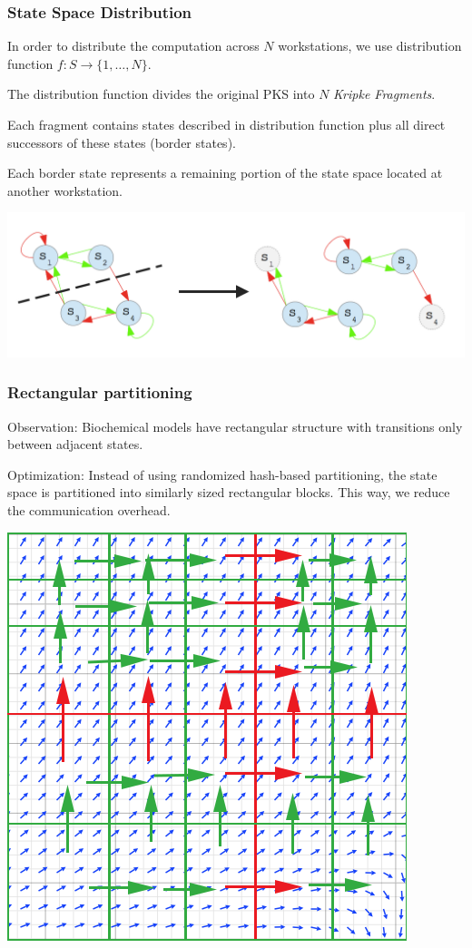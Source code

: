 \documentclass{beamer}
\begin{document}
  \begin{frame}
  	\frametitle{State Space Distribution}
  	In order to distribute the computation across $N$ workstations, we use distribution function $f: S \rightarrow \{1, \dots, N\}$.
  	
  	The distribution function divides the original PKS into $N$ \emph{Kripke Fragments}. 
  	
  	Each fragment contains states described in distribution function plus all direct successors of these states (border states).
  	
  	Each border state represents a remaining portion of the state space located at another workstation.
  	
  	\begin{center}
	  	\includegraphics[scale=0.3]{partition.png}  	
  	\end{center}
  \end{frame}
  \begin{frame}
		\frametitle{Rectangular partitioning}
		
		Observation: Biochemical models have rectangular structure with transitions only between adjacent states.
		
		Optimization: Instead of using randomized hash-based partitioning, the state space is partitioned into similarly sized rectangular blocks. This way, we reduce the communication overhead.
		
		\begin{center}
			\includegraphics[scale=0.3]{trans.png}		
		\end{center}
  \end{frame}
\end{document}
